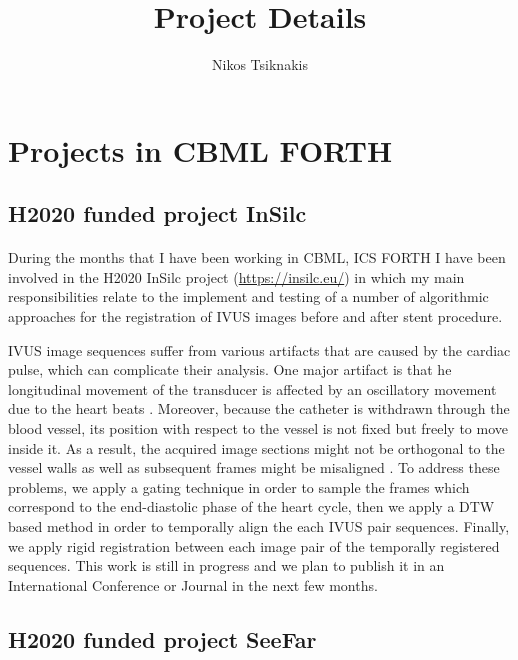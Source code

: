 \documentclass{article}
\begin{document}
\title{Project Details}
\author{Nikos Tsiknakis}

\maketitle

\section{Projects in CBML FORTH}

\subsection{H2020 funded project InSilc}
\paragraph{}
During the months that I have been working in CBML, ICS FORTH I have been involved in the H2020 InSilc project (\url{https://insilc.eu/}) in which my main responsibilities relate to the implement and testing of a number of algorithmic approaches for the registration of IVUS images before and after stent procedure.

IVUS image sequences suffer from various artifacts that are caused by the cardiac pulse, which can complicate their analysis. One major artifact is that he longitudinal movement of the transducer is affected by an oscillatory movement due to the heart beats \cite{alberti2012automatic}. Moreover, because the catheter is withdrawn through the blood vessel, its position with respect to the vessel is not fixed but freely to move inside it. As a result, the acquired image sections might not be orthogonal to the vessel walls \cite{gatta2008robust} as well as subsequent frames might be misaligned \cite{alberti2012automatic}. To address these problems, we apply a gating technique in order to sample the frames which correspond to the end-diastolic phase of the heart cycle, then we apply a DTW based method in order to temporally align the each IVUS pair sequences. Finally, we apply rigid registration between each image pair of the temporally registered sequences. This work is still in progress and we plan to publish it in an International Conference or Journal in the next few months.


\subsection{H2020 funded project SeeFar}
\end{document}
